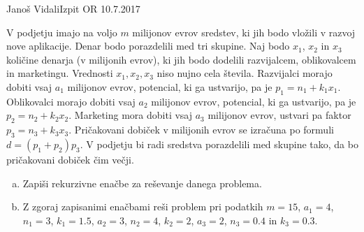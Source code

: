 \begin{naloga}{Janoš Vidali}{Izpit OR 10.7.2017}
\begin{vprasanje}
V podjetju imajo na voljo $m$ milijonov evrov sredstev,
ki jih bodo vložili v razvoj nove aplikacije.
Denar bodo porazdelili med tri skupine.
Naj bodo $x_1$, $x_2$ in $x_3$ količine denarja (v milijonih evrov),
ki jih bodo dodelili razvijalcem, oblikovalcem in marketingu.
Vrednosti $x_1, x_2, x_3$ niso nujno cela števila.
Razvijalci morajo dobiti vsaj $a_1$ milijonov evrov,
potencial, ki ga ustvarijo, pa je $p_1 = n_1 + k_1 x_1$.
Oblikovalci morajo dobiti vsaj $a_2$ milijonov evrov,
potencial, ki ga ustvarijo, pa je $p_2 = n_2 + k_2 x_2$.
Marketing mora dobiti vsaj $a_3$ milijonov evrov,
ustvari pa faktor $p_3 = n_3 + k_3 x_3$.
Pričakovani dobiček v milijonih evrov
se izračuna po formuli $d = (p_1 + p_2) p_3$.
V podjetju bi radi sredstva porazdelili med skupine tako,
da bo pričakovani dobiček čim večji.

\begin{enumerate}[(a)]
\item Zapiši rekurzivne enačbe za reševanje danega problema.
\item Z zgoraj zapisanimi enačbami reši problem
pri podatkih $m = 15$, $a_1 = 4$, $n_1 = 3$, $k_1 = 1.5$,
$a_2 = 3$, $n_2 = 4$, $k_2 = 2$, $a_3 = 2$, $n_3 = 0.4$ in $k_3 = 0.3$.
\end{enumerate}
\end{vprasanje}
\begin{odgovor}
\end{odgovor}
\end{naloga}


